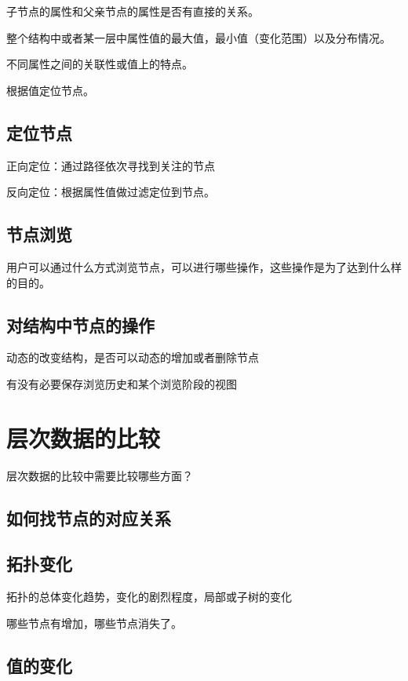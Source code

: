 \documentclass{article}
\begin{document}
子节点的属性和父亲节点的属性是否有直接的关系。

整个结构中或者某一层中属性值的最大值，最小值（变化范围）以及分布情况。

不同属性之间的关联性或值上的特点。

根据值定位节点。

\subsection{定位节点}

正向定位：通过路径依次寻找到关注的节点

反向定位：根据属性值做过滤定位到节点。

\subsection{节点浏览}

用户可以通过什么方式浏览节点，可以进行哪些操作，这些操作是为了达到什么样的目的。

\subsection{对结构中节点的操作}

动态的改变结构，是否可以动态的增加或者删除节点

有没有必要保存浏览历史和某个浏览阶段的视图


\section{层次数据的比较}

层次数据的比较中需要比较哪些方面？

\subsection{如何找节点的对应关系}

\subsection{拓扑变化}

拓扑的总体变化趋势，变化的剧烈程度，局部或子树的变化

哪些节点有增加，哪些节点消失了。

\subsection{值的变化}
\end{document}
